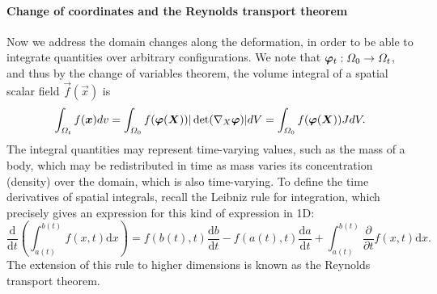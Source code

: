 \paragraph{Change of coordinates and the Reynolds transport theorem}
Now we address the domain changes along the deformation, in order to be able to integrate quantities over arbitrary configurations. We note that $\vvarphi_t:\Omega_0 \to \Omega_t$, and thus by the change of variables theorem, the volume integral of a spatial scalar field $\vec f(\vec x)$ is 
\begin{equation*}
    \int_{\Omega_t}f(\vec x)dv = \int_{\Omega_0} f(\vvarphi(\vec X)) |\det(\vX\vvarphi)| dV = \int_{\Omega_0}f(\vvarphi(\vec X)) JdV.
\end{equation*}
The integral quantities may represent time-varying values, such as the mass of a body, which may be redistributed in time as mass varies its concentration (density) over the domain, which is also time-varying. To define the time derivatives of spatial integrals, recall the Leibniz rule for integration, which precisely gives an expression for this kind of expression in 1D:
\begin{equation*}
    \frac{\mathrm{d}}{\mathrm{d}t}\left(\int_{a(t)}^{b(t)}f(x,t) \mathrm{d}x\right) = f(b(t),t) \frac{\mathrm{d}b}{\mathrm{d}t} - f(a(t),t) \frac{\mathrm{d}a}{\mathrm{d}t} + \int_{a(t)}^{b(t)}\frac{\partial}{\partial t}f(x,t)\mathrm{d}x.
\end{equation*}
The extension of this rule to higher dimensions is known as the Reynolds transport theorem. 
